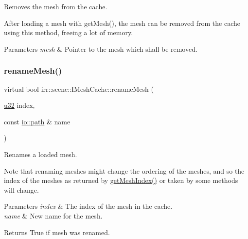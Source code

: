 Removes the mesh from the cache. 

After loading a mesh with get\+Mesh(), the mesh can be removed from the cache using this method, freeing a lot of memory. 
\begin{DoxyParams}{Parameters}
{\em mesh} & Pointer to the mesh which shall be removed. \\
\hline
\end{DoxyParams}
\mbox{\label{classirr_1_1scene_1_1IMeshCache_a820743b703cdc4362a3dbe6664271bcb}} 
\subsubsection{\texorpdfstring{rename\+Mesh()}{renameMesh()}\hspace{0.1cm}{\footnotesize\ttfamily [1/4]}}
{\footnotesize\ttfamily virtual bool irr\+::scene\+::\+I\+Mesh\+Cache\+::rename\+Mesh (\begin{DoxyParamCaption}\item[{\hyperlink{namespaceirr_a0416a53257075833e7002efd0a18e804}{u32}}]{index,  }\item[{const \hyperlink{namespaceirr_1_1io_a6468281622ce3a1c46b72e19f32dded5}{io\+::path} \&}]{name }\end{DoxyParamCaption})\hspace{0.3cm}{\ttfamily [pure virtual]}}



Renames a loaded mesh. 

Note that renaming meshes might change the ordering of the meshes, and so the index of the meshes as returned by \hyperlink{classirr_1_1scene_1_1IMeshCache_a2b3512bd3ff11d0b290fa5d2d580eb54}{get\+Mesh\+Index()} or taken by some methods will change. 
\begin{DoxyParams}{Parameters}
{\em index} & The index of the mesh in the cache. \\
\hline
{\em name} & New name for the mesh. \\
\hline
\end{DoxyParams}
\begin{DoxyReturn}{Returns}
True if mesh was renamed. 
\end{DoxyReturn}
\mbox{\label{classirr_1_1scene_1_1IMeshCache_a820743b703cdc4362a3dbe6664271bcb}} 

